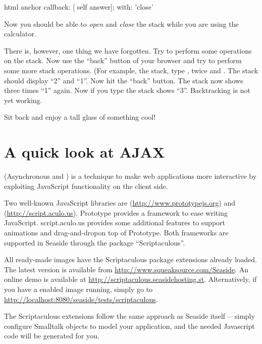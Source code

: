 \documentclass[a4paper,10pt,twoside]{book}
\begin{document}
\begin{code}{}
html anchor
	callback: [ self answer];
	with: 'close'
\end{code}

Now you should be able to \emph{open} and \emph{close} the stack while you are using the
calculator.

There is, however, one thing we have forgotten.
Try to perform some operations on the stack.
Now use the ``back'' button of your browser and try to perform some more stack
operations.
(For example,  the stack, type ,  twice and \menu {+}.
The stack should display ``2'' and ``1''.
Now hit the ``back'' button.
The stack now shows three times ``1'' again.
Now if you type \menu{+} the stack shows ``3''.
Backtracking is not yet working.


Sit back and enjoy a tall glass of something cool!

\section{A quick look at AJAX}


 (Asynchronous  and ) is a technique to make web
applications more interactive by exploiting JavaScript functionality on the client side.

Two well-known JavaScript libraries are 
(\url{http://www.prototypejs.org}) and 
(\url{http://script.aculo.us}).
Prototype provides a framework to ease writing JavaScript.
script.aculo.us provides some additional features to support animations and drag-and-dropon top of Prototype.
Both frameworks are supported in Seaside through the package ``Scriptaculous''.

All ready-made images have the Scriptaculous package extensions already loaded.
The latest version is available from \url{http://www.squeaksource.com/Seaside}.
An online demo is available at \url{http://scriptaculous.seasidehosting.st}.
Alternatively, if you have a enabled image running, simply go to
\url{http://localhost:8080/seaside/tests/scriptaculous}.

The Scriptaculous extensions follow the same approach as Seaside itself\,---\,simply
configure Smalltalk objects to model your application, and the needed Javascript code
will be generated for you.
\end{document}
